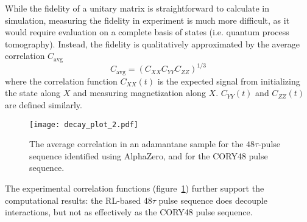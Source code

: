 While the fidelity of a unitary matrix is straightforward to calculate in simulation, measuring the fidelity in experiment is much more difficult, as it would require evaluation on a complete basis of states (i.e. quantum process tomography).
Instead, the fidelity is qualitatively approximated by the average correlation $C_\text{avg}$ \cite{peng2021deep}
\[
C_\text{avg} = (C_{XX} C_{YY} C_{ZZ})^{1/3}
\]
where the correlation function $C_{XX}(t)$ is the expected signal from initializing the state along $X$ and measuring magnetization along $X$. $C_{YY}(t)$ and $C_{ZZ}(t)$ are defined similarly.

\begin{figure}[H]
    \centering
    \texttt{[image: decay\_plot\_2.pdf]}
    \caption{The average correlation in an adamantane sample for the $48\tau$-pulse sequence identified using AlphaZero, and for the CORY48 pulse sequence.}
    \label{fig:decay_plot}
\end{figure}

The experimental correlation functions (figure~\ref{fig:decay_plot}) further support the computational results: the RL-based $48\tau$ pulse sequence does decouple interactions, but not as effectively as the CORY48 pulse sequence.
